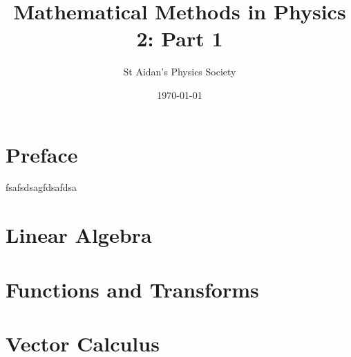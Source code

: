 \documentclass{physics_notes}
\title{Mathematical Methods in Physics 2: Part 1}
\author{St Aidan's Physics Society}
\date{\today}
\begin{document}
\maketitle


\tableofcontents
\newpage

\section{Preface}
fsafsdsagfdsafdsa

\section{Linear Algebra}



\section{Functions and Transforms}


\section{Vector Calculus}

\end{document}

